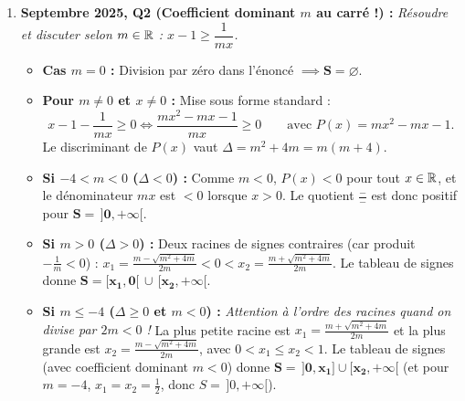 \begin{exemple}
\begin{enumerate}
    \item \textbf{Septembre 2025, Q2 (Coefficient dominant $m$ au carré !) :} \emph{Résoudre et discuter selon $m \in \mathbb{R}$ : $x - 1 \ge \dfrac{1}{mx}$.}\\
    \begin{itemize}
        \item \textbf{Cas $m = 0$ :} Division par zéro dans l'énoncé $\implies \mathbf{S = \varnothing}$.
        \item \textbf{Pour $m \neq 0$ et $x \neq 0$ :} Mise sous forme standard :
        \[
            x - 1 - \frac{1}{mx} \ge 0 \iff \frac{mx^2 - mx - 1}{mx} \ge 0 \qquad \text{avec } P(x) = mx^2 - mx - 1.
        \]
        Le discriminant de $P(x)$ vaut $\Delta = m^2 + 4m = m(m + 4)$.
        \item \textbf{Si $-4 < m < 0$ ($\Delta < 0$) :} Comme $m < 0$, $P(x) < 0$ pour tout $x \in \mathbb{R}$, et le dénominateur $mx$ est $< 0$ lorsque $x > 0$. Le quotient $\frac{-}{-}$ est donc positif pour $\mathbf{S = \,]0, +\infty[}$.
        \item \textbf{Si $m > 0$ ($\Delta > 0$) :} Deux racines de signes contraires (car produit $-\frac{1}{m} < 0$) : $x_1 = \frac{m - \sqrt{m^2+4m}}{2m} < 0 < x_2 = \frac{m + \sqrt{m^2+4m}}{2m}$. Le tableau de signes donne $\mathbf{S = [x_1, 0[ \,\cup\, [x_2, +\infty[}$.
        \item \textbf{Si $m \le -4$ ($\Delta \ge 0$ et $m < 0$) :} \emph{Attention à l'ordre des racines quand on divise par $2m < 0$ !} La plus petite racine est $x_1 = \frac{m + \sqrt{m^2+4m}}{2m}$ et la plus grande est $x_2 = \frac{m - \sqrt{m^2+4m}}{2m}$, avec $0 < x_1 \le x_2 < 1$. Le tableau de signes (avec coefficient dominant $m < 0$) donne $\mathbf{S = \,]0, x_1] \cup [x_2, +\infty[}$ (et pour $m = -4$, $x_1 = x_2 = \frac{1}{2}$, donc $S = \,]0, +\infty[$).
    \end{itemize}


\end{enumerate}
\end{exemple}
